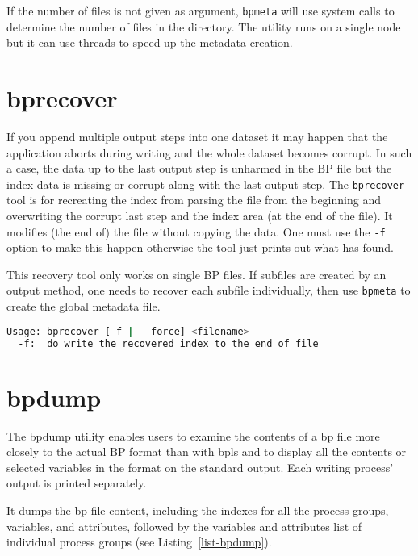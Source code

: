 If the number of files is not given as argument, \verb+bpmeta+ will use system calls to determine the number of files in the directory. The utility runs on a single node but it can use threads to speed up the metadata creation. 

\section{bprecover}

If you append multiple output steps into one dataset it may happen that the application aborts during writing and the whole dataset becomes corrupt. In such a case, the data up to the last output step is unharmed in the BP file but the index data is missing or corrupt along with the last output step. The \verb+bprecover+ tool is for recreating the index from parsing the file from the beginning and overwriting the corrupt last step and the index area (at the end of the file). It modifies (the end of) the file without copying the data. One must use the \verb+-f+ option to make this happen otherwise the tool just prints out what has found. 

This recovery tool only works on single BP files. If subfiles are created by an output method, one needs to recover each subfile individually, then use \verb+bpmeta+ to create the global metadata file. 

\begin{lstlisting}[language=bash,caption={},label={}] 
Usage: bprecover [-f | --force] <filename>
  -f:  do write the recovered index to the end of file
\end{lstlisting}


\section{bpdump}

The bpdump utility enables users to examine the contents of a bp file more closely 
to the actual BP format than with bpls and to display all the contents or selected 
variables in the format on the standard output. Each writing process' output is 
printed separately. 

It dumps the bp file content, including the indexes for all the process groups, 
variables, and attributes, followed by the variables and attributes list of individual 
process groups (see Listing~\ref{list-bpdump}).

